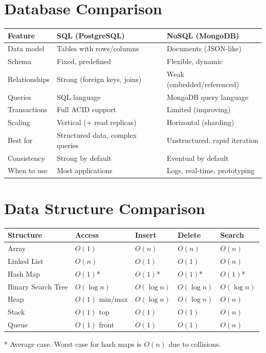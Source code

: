 \documentclass[12pt, a4paper, oneside]{book}
\begin{document}
\section{Database Comparison}

\begin{center}
\begin{tabular}{l l l}
\toprule
\textbf{Feature} & \textbf{SQL (PostgreSQL)} & \textbf{NoSQL (MongoDB)} \\
\midrule
Data model & Tables with rows/columns & Documents (JSON-like) \\
Schema & Fixed, predefined & Flexible, dynamic \\
Relationships & Strong (foreign keys, joins) & Weak (embedded/referenced) \\
Queries & SQL language & MongoDB query language \\
Transactions & Full ACID support & Limited (improving) \\
Scaling & Vertical (+ read replicas) & Horizontal (sharding) \\
Best for & Structured data, complex queries & Unstructured, rapid iteration \\
Consistency & Strong by default & Eventual by default \\
When to use & Most applications & Logs, real-time, prototyping \\
\bottomrule
\end{tabular}
\end{center}

\section{Data Structure Comparison}

\begin{center}
\begin{tabular}{l l l l l}
\toprule
\textbf{Structure} & \textbf{Access} & \textbf{Insert} & \textbf{Delete} & \textbf{Search} \\
\midrule
Array & $O(1)$ & $O(n)$ & $O(n)$ & $O(n)$ \\
Linked List & $O(n)$ & $O(1)$ & $O(1)$ & $O(n)$ \\
Hash Map & $O(1)$* & $O(1)$* & $O(1)$* & $O(1)$* \\
Binary Search Tree & $O(\log n)$ & $O(\log n)$ & $O(\log n)$ & $O(\log n)$ \\
Heap & $O(1)$ min/max & $O(\log n)$ & $O(\log n)$ & $O(n)$ \\
Stack & $O(1)$ top & $O(1)$ & $O(1)$ & $O(n)$ \\
Queue & $O(1)$ front & $O(1)$ & $O(1)$ & $O(n)$ \\
\bottomrule
\end{tabular}
\end{center}
\small{* Average case. Worst case for hash maps is $O(n)$ due to collisions.}
\end{document}
